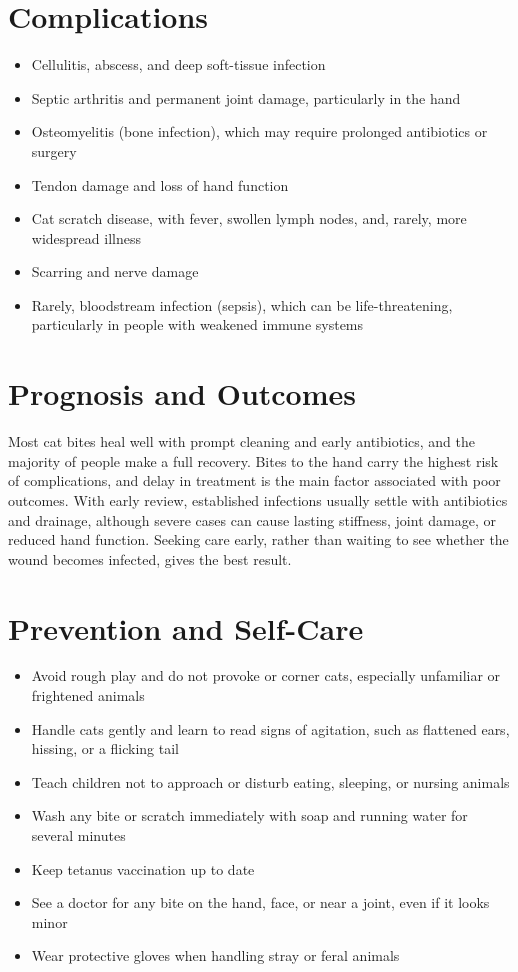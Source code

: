 \section*{Complications}
\begin{itemize}
    \item Cellulitis, abscess, and deep soft-tissue infection
    \item Septic arthritis and permanent joint damage, particularly in the hand
    \item Osteomyelitis (bone infection), which may require prolonged antibiotics or surgery
    \item Tendon damage and loss of hand function
    \item Cat scratch disease, with fever, swollen lymph nodes, and, rarely, more widespread illness
    \item Scarring and nerve damage
    \item Rarely, bloodstream infection (sepsis), which can be life-threatening, particularly in people with weakened immune systems
\end{itemize}

\section*{Prognosis and Outcomes}
Most cat bites heal well with prompt cleaning and early antibiotics, and the majority of people make a full recovery. Bites to the hand carry the highest risk of complications, and delay in treatment is the main factor associated with poor outcomes. With early review, established infections usually settle with antibiotics and drainage, although severe cases can cause lasting stiffness, joint damage, or reduced hand function. Seeking care early, rather than waiting to see whether the wound becomes infected, gives the best result.

\section*{Prevention and Self-Care}
\begin{itemize}
    \item Avoid rough play and do not provoke or corner cats, especially unfamiliar or frightened animals
    \item Handle cats gently and learn to read signs of agitation, such as flattened ears, hissing, or a flicking tail
    \item Teach children not to approach or disturb eating, sleeping, or nursing animals
    \item Wash any bite or scratch immediately with soap and running water for several minutes
    \item Keep tetanus vaccination up to date
    \item See a doctor for any bite on the hand, face, or near a joint, even if it looks minor
    \item Wear protective gloves when handling stray or feral animals
\end{itemize}

